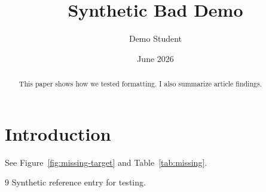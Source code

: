 \documentclass[12pt]{report}
\title{Synthetic Bad Demo}
\author{Demo Student}
\date{June 2026}
\begin{document}
\maketitle

\begin{abstract}
This paper shows how we tested formatting. I also summarize article findings.
\end{abstract}

\tableofcontents

\vspace{1em}

\chapter{Introduction}
See Figure~\ref{fig:missing-target} and Table~\ref{tab:missing}.

\begin{figure}[h]
\label{fig:dup}
\end{figure}

\begin{table}[h]
\caption{Table caption without punctuation}
\label{tab bad}
\end{table}

\label{fig:dup}
\label{bad label}

\begin{thebibliography}{9}
 Synthetic reference entry for testing.
\end{thebibliography}
\end{document}
